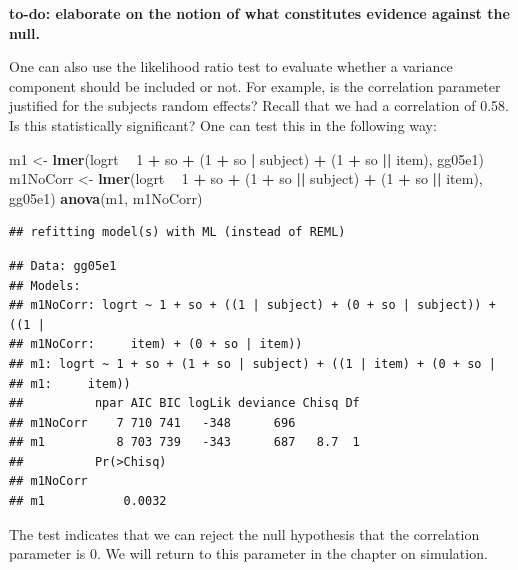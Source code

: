 \documentclass[12pt,]{krantz}
\newenvironment{Shaded}{\begin{snugshade}}{\end{snugshade}}
\newcommand{\DecValTok}[1]{\textcolor[rgb]{0.00,0.00,0.81}{#1}}
\newcommand{\KeywordTok}[1]{\textcolor[rgb]{0.13,0.29,0.53}{\textbf{#1}}}
\newcommand{\NormalTok}[1]{#1}
\newcommand{\OperatorTok}[1]{\textcolor[rgb]{0.81,0.36,0.00}{\textbf{#1}}}
\newcommand{\StringTok}[1]{\textcolor[rgb]{0.31,0.60,0.02}{#1}}
\begin{document}
\textbf{to-do: elaborate on the notion of what constitutes evidence against the null.}

One can also use the likelihood ratio test to evaluate whether a variance component should be included or not. For example, is the correlation parameter justified for the subjects random effects? Recall that we had a correlation of 0.58. Is this statistically significant? One can test this in the following way:

\begin{Shaded}
\begin{Highlighting}[]
\NormalTok{m1 <-}\StringTok{ }\KeywordTok{lmer}\NormalTok{(logrt }\OperatorTok{~}\StringTok{ }\DecValTok{1} \OperatorTok{+}\StringTok{ }\NormalTok{so }\OperatorTok{+}\StringTok{ }\NormalTok{(}\DecValTok{1} \OperatorTok{+}\StringTok{ }\NormalTok{so }\OperatorTok{|}\StringTok{ }\NormalTok{subject) }\OperatorTok{+}\StringTok{ }\NormalTok{(}\DecValTok{1} \OperatorTok{+}\StringTok{ }
\StringTok{  }\NormalTok{so }\OperatorTok{||}\StringTok{ }\NormalTok{item), gg05e1)}
\NormalTok{m1NoCorr <-}\StringTok{ }\KeywordTok{lmer}\NormalTok{(logrt }\OperatorTok{~}\StringTok{ }\DecValTok{1} \OperatorTok{+}\StringTok{ }\NormalTok{so }\OperatorTok{+}\StringTok{ }\NormalTok{(}\DecValTok{1} \OperatorTok{+}\StringTok{ }\NormalTok{so }\OperatorTok{||}\StringTok{ }\NormalTok{subject) }\OperatorTok{+}\StringTok{ }
\StringTok{  }\NormalTok{(}\DecValTok{1} \OperatorTok{+}\StringTok{ }\NormalTok{so }\OperatorTok{||}\StringTok{ }\NormalTok{item), gg05e1)}
\KeywordTok{anova}\NormalTok{(m1, m1NoCorr)}
\end{Highlighting}
\end{Shaded}

\begin{verbatim}
## refitting model(s) with ML (instead of REML)
\end{verbatim}

\begin{verbatim}
## Data: gg05e1
## Models:
## m1NoCorr: logrt ~ 1 + so + ((1 | subject) + (0 + so | subject)) + ((1 | 
## m1NoCorr:     item) + (0 + so | item))
## m1: logrt ~ 1 + so + (1 + so | subject) + ((1 | item) + (0 + so | 
## m1:     item))
##          npar AIC BIC logLik deviance Chisq Df
## m1NoCorr    7 710 741   -348      696         
## m1          8 703 739   -343      687   8.7  1
##          Pr(>Chisq)
## m1NoCorr           
## m1           0.0032
\end{verbatim}

The test indicates that we can reject the null hypothesis that the correlation parameter is 0. We will return to this parameter in the chapter on simulation.
\end{document}

